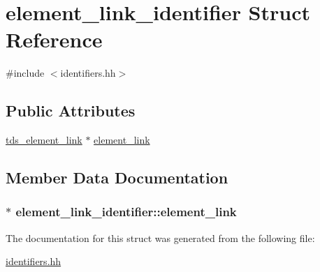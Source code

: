 \hypertarget{structelement__link__identifier}{}\section{element\+\_\+link\+\_\+identifier Struct Reference}
\label{structelement__link__identifier}


{\ttfamily \#include $<$identifiers.\+hh$>$}

\subsection*{Public Attributes}
\begin{DoxyCompactItemize}
\item 
\hyperlink{classtds__element__link}{tds\+\_\+element\+\_\+link} $\ast$ \hyperlink{structelement__link__identifier_a6cbf33d61c44c54e1a21f0329f453134}{element\+\_\+link}
\end{DoxyCompactItemize}


\subsection{Member Data Documentation}
\subsubsection[{\texorpdfstring{element\+\_\+link}{element_link}}]{$\ast$ element\+\_\+link\+\_\+identifier\+::element\+\_\+link}\hypertarget{structelement__link__identifier_a6cbf33d61c44c54e1a21f0329f453134}{}\label{structelement__link__identifier_a6cbf33d61c44c54e1a21f0329f453134}


The documentation for this struct was generated from the following file\+:\begin{DoxyCompactItemize}
\item 
\hyperlink{identifiers_8hh}{identifiers.\+hh}\end{DoxyCompactItemize}
